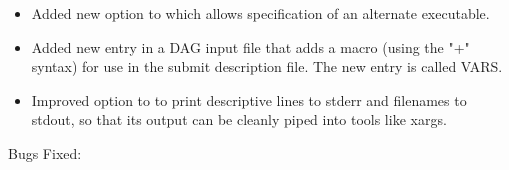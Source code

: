 \begin{itemize}
\item Added new option  to  which allows 
specification of an alternate  executable. 

\item Added new entry in a DAG input file that adds a macro (using the
"+" syntax) for use in the submit description file.  The new entry
is called VARS.

\item Improved  option to  to print
      descriptive lines to stderr and filenames to stdout, so that its
      output can be cleanly piped into tools like xargs.

\end{itemize}

\noindent Bugs Fixed:

